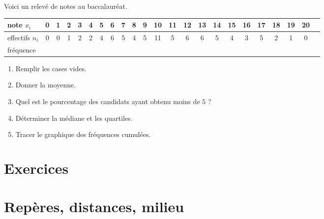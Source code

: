 \begin{example}
    Voici un relevé de notes au baccalauréat.
    \begin{center}
        \begin{tabular}{|l||c|c|c|c|c|c|c|c|c|c|c|c|c|c|c|c|c|c|c|c|c||c|}
            \hline
            note \( x_i\)&0&1&2&3&4&5&6&7&8&9&10&11&12&13&14&15&16&17&18&19&20\\
            \hline
            effectifs \( n_i\)&0&0&1&2&2&4&6&5&4&5&11&5&6&6&5&4&3&5&2&1&0\\
            \hline
            fréquence&&&&&&&&&&&&&&&&&&&&&\\
            \hline
        \end{tabular}
    \end{center}
    \begin{enumerate}
        \item
            Remplir les cases vides.
        \item
            Donner la moyenne.
        \item
            Quel est le pourcentage des candidats ayant obtenu moins de \( 5\) ?
        \item
            Déterminer la médiane et les quartiles.
        \item
            Tracer le graphique des fréquences cumulées.
    \end{enumerate}

    

\end{example}

\section{Exercices}


\section{Repères, distances, milieu}


